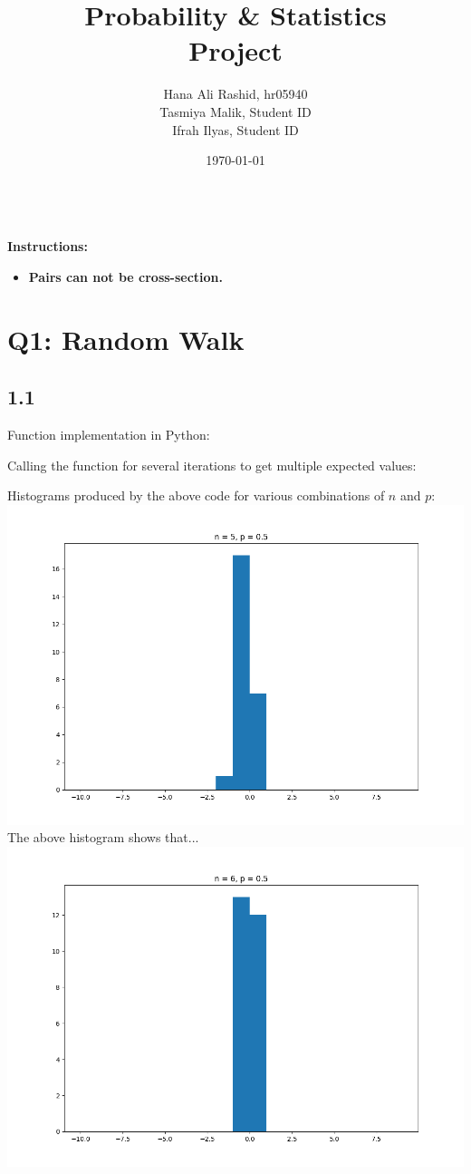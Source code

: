 \documentclass[answers]{exam}
\title{Probability \& Statistics\\ Project}
\author{Hana Ali Rashid, hr05940\\ Tasmiya Malik, Student ID\\ Ifrah Ilyas, Student ID}
\date{\today{}}
\begin{document}
\maketitle

\noindent \hrulefill \\
\textbf{Instructions:}
\begin{itemize}
    \item \textbf{Pairs can not be cross-section.}
\end{itemize}

\noindent \hrulefill

\section*{Q1: Random Walk}
\subsection*{1.1}
Function implementation in Python:

Calling the function for several iterations to get multiple expected values:

\pagebreak
Histograms produced by the above code for various combinations of $n$ and $p$:\\
\includegraphics[scale = 0.7]{Q1_histograms/q1n = 5, p = 0.5.png}\\
The above histogram shows that...\\
\includegraphics[scale = 0.7]{Q1_histograms/q1n = 6, p = 0.5.png}\\
\end{document}
